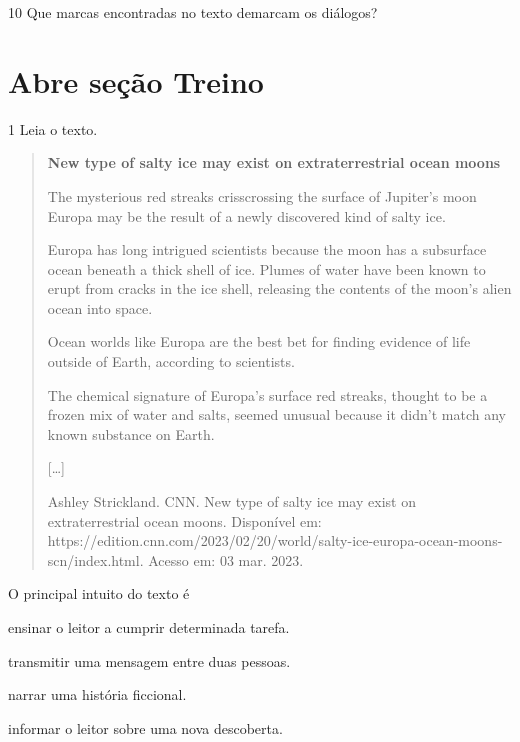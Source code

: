 
\num{10} Que marcas encontradas no texto demarcam os diálogos?

\linhas[4]


\section{Abre seção Treino}

\num{1} Leia o texto.

\begin{quote}
\textbf{New type of salty ice may exist on extraterrestrial ocean moons}

The mysterious red streaks crisscrossing the surface of Jupiter's moon
Europa may be the result of a newly discovered kind of salty ice.

Europa has long intrigued scientists because the moon has a subsurface
ocean beneath a thick shell of ice. Plumes of water have been known to
erupt from cracks in the ice shell, releasing the contents of the moon's
alien ocean into space.

Ocean worlds like Europa are the best bet for finding evidence of life
outside of Earth, according to scientists.

The chemical signature of Europa's surface red streaks, thought to be a
frozen mix of water and salts, seemed unusual because it didn't match
any known substance on Earth.

{[}\ldots{}{]}

Ashley Strickland. CNN. New type of salty ice may exist on
extraterrestrial ocean moons. Disponível em:
https://edition.cnn.com/2023/02/20/world/salty-ice-europa-ocean-moons-scn/index.html.
Acesso em: 03 mar. 2023.
\end{quote}


O principal intuito do texto é

\begin{escolha}
\item ensinar o leitor a cumprir determinada tarefa.

\item transmitir uma mensagem entre duas pessoas.

\item narrar uma história ficcional.

\item informar o leitor sobre uma nova descoberta.
\end{escolha}

